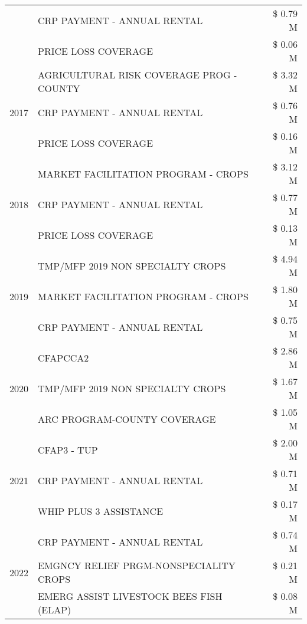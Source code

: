 \begin{tabular}{llr}
 & CRP PAYMENT - ANNUAL RENTAL & \$ 0.79 M \\
 & PRICE LOSS COVERAGE & \$ 0.06 M \\
\cline{1-3}
\multirow[t]{3}{*}{2017} & AGRICULTURAL RISK COVERAGE PROG - COUNTY & \$ 3.32 M \\
 & CRP PAYMENT - ANNUAL RENTAL & \$ 0.76 M \\
 & PRICE LOSS COVERAGE & \$ 0.16 M \\
\cline{1-3}
\multirow[t]{3}{*}{2018} & MARKET FACILITATION PROGRAM - CROPS & \$ 3.12 M \\
 & CRP PAYMENT - ANNUAL RENTAL & \$ 0.77 M \\
 & PRICE LOSS COVERAGE & \$ 0.13 M \\
\cline{1-3}
\multirow[t]{3}{*}{2019} & TMP/MFP 2019 NON SPECIALTY CROPS & \$ 4.94 M \\
 & MARKET FACILITATION PROGRAM - CROPS & \$ 1.80 M \\
 & CRP PAYMENT - ANNUAL RENTAL & \$ 0.75 M \\
\cline{1-3}
\multirow[t]{3}{*}{2020} & CFAPCCA2 & \$ 2.86 M \\
 & TMP/MFP 2019 NON SPECIALTY CROPS & \$ 1.67 M \\
 & ARC PROGRAM-COUNTY COVERAGE & \$ 1.05 M \\
\cline{1-3}
\multirow[t]{3}{*}{2021} & CFAP3 - TUP & \$ 2.00 M \\
 & CRP PAYMENT - ANNUAL RENTAL & \$ 0.71 M \\
 & WHIP PLUS 3 ASSISTANCE & \$ 0.17 M \\
\cline{1-3}
\multirow[t]{3}{*}{2022} & CRP PAYMENT - ANNUAL RENTAL & \$ 0.74 M \\
 & EMGNCY RELIEF PRGM-NONSPECIALITY CROPS & \$ 0.21 M \\
 & EMERG ASSIST LIVESTOCK BEES FISH (ELAP) & \$ 0.08 M \\
\cline{1-3}
\bottomrule
\end{tabular}
